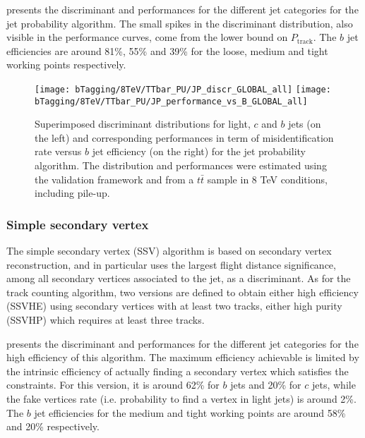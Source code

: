     presents the discriminant and
    performances for the different jet categories for the jet probability algorithm. The
    small spikes in the discriminant distribution, also visible in the performance curves,
    come from the lower bound on $P_\text{track}$. The $b$ jet efficiencies are around
    81\%, 55\% and 39\% for the loose, medium and tight working points respectively.

    \begin{figure}[th!]
        \centering
        \begin{minipage}{\textwidth}
        \texttt{[image: bTagging/8TeV/TTbar\_PU/JP\_discr\_GLOBAL\_all]}
        \texttt{[image: bTagging/8TeV/TTbar\_PU/JP\_performance\_vs\_B\_GLOBAL\_all]}
        \end{minipage}
                \caption{Superimposed discriminant distributions for light, $c$ and $b$ jets (on
        the left) and corresponding performances in term of misidentification rate versus $b$ jet efficiency
        (on the right) for the jet probability algorithm.
        The distribution and performances were estimated using the validation framework and from
        a $t\bar{t}$ sample in 8 TeV conditions, including pile-up.}
        \label{fig:bTagging/perfJP}
    \end{figure}

        \subsubsection{Simple secondary vertex}

    The simple secondary vertex (SSV) algorithm is based on secondary vertex reconstruction,
    and in particular uses the largest flight distance significance, among all secondary
    vertices associated to the jet, as a discriminant. As for the track counting algorithm, two versions are defined
    to obtain either high efficiency (SSVHE) using secondary vertices with at least two
    tracks, either high purity (SSVHP) which requires at least three tracks.

     presents the discriminant and
    performances for the different jet categories for the high efficiency of this algorithm.
    The maximum efficiency achievable is limited by the intrinsic efficiency of
    actually finding a secondary vertex which satisfies the constraints. For this version,
    it is around 62\% for $b$ jets and 20\% for $c$ jets, while the fake vertices rate (i.e.
    probability to find a vertex in light jets) is around 2\%. The $b$ jet efficiencies
    for the medium and tight working points are around 58\% and 20\% respectively.

